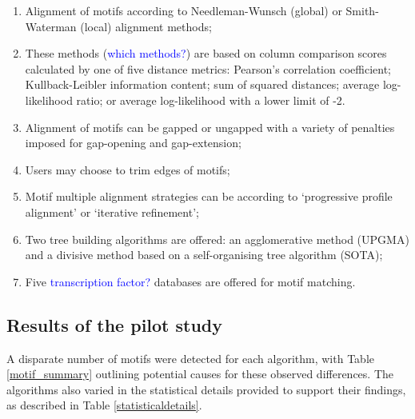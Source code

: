 \documentclass[12pt]{article}
\begin{document}
\begin{enumerate}
\item Alignment of motifs according to Needleman-Wunsch (global) or Smith-Waterman (local) alignment methods;
\item These methods (\textcolor{blue}{which methods?}) are based on column comparison scores calculated by one of five distance metrics: Pearson's correlation coefficient; Kullback-Leibler information content; sum of squared distances; average log-likelihood ratio; or average log-likelihood with a lower limit of -2.
\item Alignment of motifs can be gapped or ungapped with a variety of penalties imposed for gap-opening and gap-extension;
\item Users may choose to trim edges of motifs;
\item Motif multiple alignment strategies can be according to `progressive profile alignment' or `iterative refinement';
\item  Two tree building algorithms are offered: an agglomerative method (UPGMA) and a divisive method based on a self-organising tree algorithm (SOTA);
\item Five \textcolor{blue}{transcription factor?} databases are offered for motif matching.
\end{enumerate}
\subsection{Results of the pilot study}

A disparate number of motifs were detected for each algorithm, with Table \ref{motif_summary} outlining potential causes for these observed differences. The algorithms also varied in the statistical details provided to support their findings, as described in Table \ref{statisticaldetails}.
\end{document}
